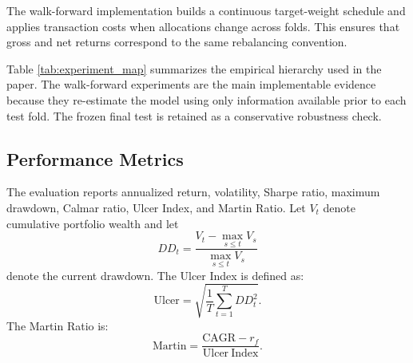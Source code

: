 \documentclass[11pt]{article}
\begin{document}
The walk-forward implementation builds a continuous target-weight schedule and applies transaction costs when allocations change across folds. This ensures that gross and net returns correspond to the same rebalancing convention.

Table \ref{tab:experiment_map} summarizes the empirical hierarchy used in the paper. The walk-forward experiments are the main implementable evidence because they re-estimate the model using only information available prior to each test fold. The frozen final test is retained as a conservative robustness check.

\begin{table}[h!]
\centering
\caption{Empirical experiment map}
\label{tab:experiment_map}
\end{table}


\subsection{Performance Metrics}

The evaluation reports annualized return, volatility, Sharpe ratio, maximum drawdown, Calmar ratio, Ulcer Index, and Martin Ratio. Let $V_t$ denote cumulative portfolio wealth and let
\begin{equation}
DD_t = \frac{V_t - \max_{s \leq t} V_s}{\max_{s \leq t} V_s}
\end{equation}
denote the current drawdown. The Ulcer Index is defined as:
\begin{equation}
\mathrm{Ulcer} = \sqrt{\frac{1}{T}\sum_{t=1}^T DD_t^2}.
\end{equation}
The Martin Ratio is:
\begin{equation}
\mathrm{Martin} =
\frac{\mathrm{CAGR} - r_f}{\mathrm{Ulcer\ Index}}.
\end{equation}
\end{document}
